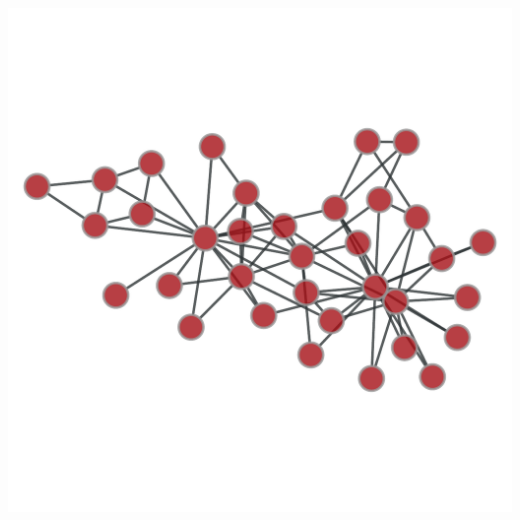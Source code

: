 \documentclass{beamer}
\begin{document}
\begin{frame}
    \centering
    \includegraphics[width=0.8\columnwidth]{karate_raw.pdf}
\end{frame}
\end{document}
